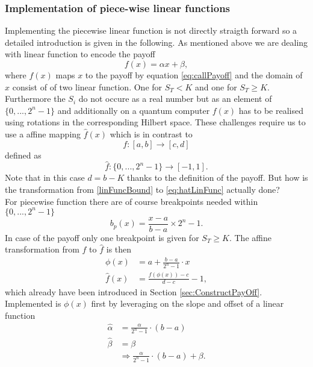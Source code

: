 \documentclass[../../main.tex]{subfiles}
\begin{document}
\subsubsection{Implementation of piece-wise linear functions}\label{sec:ImplPieceFunc}

Implementing the piecewise linear function is not directly straigth forward so a detailed introduction is given in the following. 
As mentioned above we are dealing with linear function to encode the payoff
\begin{equation}\label{eq:defLinearFunc}
  f(x) = \alpha x + \beta,
\end{equation}
where $f(x)$ maps $x$ to the payoff by equation \ref{eq:callPayoff} and the domain of $x$ consist of of two linear function. One for $S_T < K$ and one for $S_T \geq K$. 
Furthermore the $S_i$ do not occure as a real number but as an element of $\{ 0,...,2^n-1 \}$ and additionally on a quantum computer $f(x)$ has to be realised
using rotations in the corresponding Hilbert space. 
These challenges require us to use a affine mapping $\hat{f}(x)$ which is in contrast to
\begin{equation}\label{eq:linFuncBound}
  f: [ a,b ] \rightarrow [ c,d ]
\end{equation}
defined as
\begin{equation}\label{eq:hatLinFunc}
  \hat{f}: \{0,...,2^n-1 \} \rightarrow [ -1,1 ].
\end{equation}
Note that in this case $d=b-K$ thanks to the definition of the payoff. But how is the transformation from \ref{linFuncBound}
to \ref{eq:hatLinFunc} actually done?\\
For piecewise function there are of course breakpoints needed within $\{ 0,...,2^n-1 \}$
\begin{equation}\label{eq:breakpoints}
b_p(x) = \frac{x-a}{b-a} \times 2^n-1.
\end{equation}
In case of the payoff only one breakpoint is given for $ S_T \geq K $.
The affine transformation from $f$ to $\hat{f}$ is then
\begin{align}\label{eq:affinTransform}
  \phi(x) &= a + \frac{b-a}{2^n-1} \cdot x \\
  \hat{f}(x) &= \frac{f(\phi(x))-c}{d-c}-1,
\end{align}
which already have been introduced in Section \ref{sec:ConstructPayOff}.\\
Implemented is $\phi(x)$ first by leveraging on the slope and offset of a linear function
\begin{align}\label{eq:mappedSlopeOffset}
  \hat{\alpha} &= \frac{\alpha}{2^n-1} \cdot (b-a)\\
  \hat{\beta} &= \beta\\
  &\Rightarrow \frac{\alpha}{2^n-1} \cdot (b-a) + \beta.
\end{align}
\end{document}
